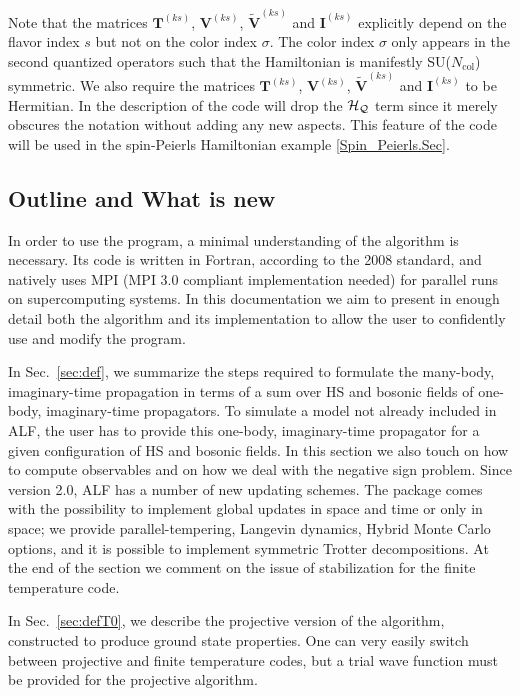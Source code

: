 Note that the matrices  $\bm{T}^{(ks)}$,  $\bm{V}^{(ks)}$, $\bm{\tilde{V}}^{(ks)}$ and  $\bm{I}^{(ks)}$ explicitly depend on the flavor index $s$ but not on the color index $\sigma$. 
The color index $\sigma$ only appears in  the  second quantized operators such that the Hamiltonian is manifestly SU($N_{\mathrm{col}}$)  symmetric.  We also require
the matrices $\bm{T}^{(ks)}$,  $\bm{V}^{(ks)}$, $\bm{\tilde{V}}^{(ks)}$ and  $\bm{I}^{(ks)}$  to be  Hermitian.   In the  description of the code will drop  the $\cal{H}_Q$ term since it merely obscures the notation without adding any new aspects. This feature of the code will be used in the spin-Peierls Hamiltonian example \ref{Spin_Peierls.Sec}.

\subsection{Outline and What is new}


In order to use the program, a minimal understanding of the algorithm is necessary. 
Its code is written in Fortran, according to the 2008 standard, and natively uses MPI (MPI 3.0 compliant implementation needed) for parallel runs on supercomputing systems.
In this documentation we aim to present in enough detail both the algorithm and its implementation to allow the user to confidently use and modify the program.

In Sec.~\ref{sec:def}, we summarize the steps required to formulate the many-body, imaginary-time propagation in terms of a sum over HS and bosonic fields of one-body, imaginary-time propagators.   
To simulate a model not already included in ALF, the user has to provide this one-body, imaginary-time propagator for a given configuration of HS and bosonic fields.  In this section we also touch on how to compute observables and on  how we deal with the negative sign problem.  Since version 2.0, ALF has a number of new updating schemes.   The package comes with  the possibility to  implement global updates in space and time or only in space; we provide parallel-tempering, Langevin dynamics, Hybrid Monte Carlo options, and it is possible to implement symmetric Trotter decompositions. At the end of the section we comment on the issue of stabilization for the finite temperature code. 

In Sec.~\ref{sec:defT0}, we describe the projective version of the algorithm, constructed to produce ground state properties. One can very easily switch between projective and finite temperature codes, but a trial wave function must be provided for the projective algorithm. 

